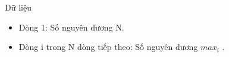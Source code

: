 Dữ liệu
\begin{itemize}
	\item     Dòng 1: Số nguyên dương N.   
	\item     Dòng i trong N dòng tiếp theo: Số nguyên dương $max_{i}$    .   
\end{itemize}
